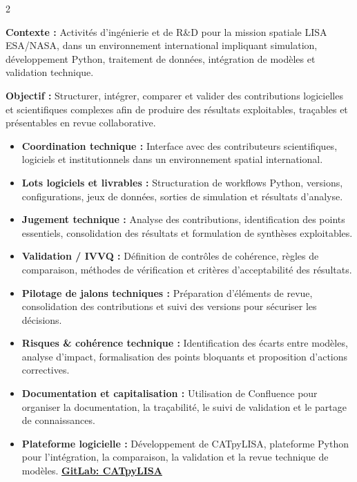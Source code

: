 \documentclass[8pt,a4paper,ragged2e,withhyper]{altacv}
\begin{document}
\begin{paracol}{2}
\divider


\textbf{Contexte :} Activités d’ingénierie et de R\&D pour la mission spatiale LISA ESA/NASA, dans un environnement international impliquant simulation, développement Python, traitement de données, intégration de modèles et validation technique.

\textbf{Objectif :} Structurer, intégrer, comparer et valider des contributions logicielles et scientifiques complexes afin de produire des résultats exploitables, traçables et présentables en revue collaborative.

\begin{itemize}
  \item \textbf{Coordination technique :} Interface avec des contributeurs scientifiques, logiciels et institutionnels dans un environnement spatial international.
  \item \textbf{Lots logiciels et livrables :} Structuration de workflows Python, versions, configurations, jeux de données, sorties de simulation et résultats d’analyse.
  \item \textbf{Jugement technique :} Analyse des contributions, identification des points essentiels, consolidation des résultats et formulation de synthèses exploitables.
  \item \textbf{Validation / IVVQ :} Définition de contrôles de cohérence, règles de comparaison, méthodes de vérification et critères d’acceptabilité des résultats.
  \item \textbf{Pilotage de jalons techniques :} Préparation d’éléments de revue, consolidation des contributions et suivi des versions pour sécuriser les décisions.
  \item \textbf{Risques \& cohérence technique :} Identification des écarts entre modèles, analyse d’impact, formalisation des points bloquants et proposition d’actions correctives.
  \item \textbf{Documentation et capitalisation :} Utilisation de Confluence pour organiser la documentation, la traçabilité, le suivi de validation et le partage de connaissances.
  \item \textbf{Plateforme logicielle :} Développement de CATpyLISA, plateforme Python pour l’intégration, la comparaison, la validation et la revue technique de modèles.
  \textcolor{DarkPastelRed}{\href{https://gitlab.oca.eu/gboileau/lisa_l3_tools}{\bf GitLab: CATpyLISA}}
\end{itemize}


\end{paracol}
\end{document}
